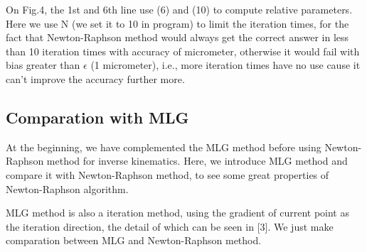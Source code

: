 \documentclass[letterpaper, 10 pt, conference]{ieeeconf}  %
\begin{document}
On Fig.4, the 1st and 6th line use (6) and (10) to compute relative parameters. Here we use N (we set it to 10 in program) to limit the iteration times, for the fact that Newton-Raphson method would always get the correct answer in less than 10 iteration times with accuracy of micrometer, otherwise it would fail with bias greater than $\epsilon$ (1 micrometer), i.e., more iteration times have no use cause it can't improve the accuracy further more.  

\subsection{Comparation with MLG}

At the beginning, we have complemented the MLG method before using Newton-Raphson method for inverse kinematics. Here, we introduce MLG method and compare it with Newton-Raphson method, to see some great properties of Newton-Raphson algorithm.

MLG method is also a iteration method, using the gradient of current point as the iteration direction, the detail of which can be seen in [3]. We just make comparation between MLG and Newton-Raphson method.
\end{document}
